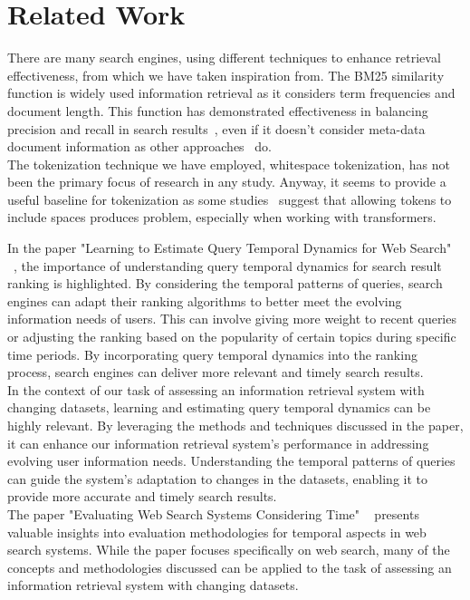 \section{Related Work}
\label{sec:related}


There are many search engines, using different techniques to enhance retrieval effectiveness, from which we have taken
inspiration from.
The BM25 similarity function is widely used information retrieval as it considers term frequencies and document length.
This function has demonstrated effectiveness in balancing precision and recall in search results~\cite{BM25}, even if it
doesn't consider meta-data document information as other approaches~\cite{robertson2009probabilistic} do.\\

The tokenization technique we have employed, whitespace tokenization, has not been the primary focus of research in any
study.
Anyway, it seems to provide a useful baseline for tokenization as some studies~\cite{gowsmith2022improving} suggest that
allowing tokens to include spaces produces problem, especially when working with transformers.


In the paper "Learning to Estimate Query Temporal Dynamics for Web Search" ~\cite{cai2014learning}, 
the importance of understanding query temporal 
dynamics for search result ranking is highlighted. By considering the temporal patterns of 
queries, search engines can adapt their ranking algorithms to better meet the evolving information 
needs of users. This can involve giving more weight to recent queries or adjusting the ranking 
based on the popularity of certain topics during specific time periods. By incorporating query 
temporal dynamics into the ranking process, search engines can deliver more relevant and timely 
search results.\\

In the context of our task of assessing an information retrieval system with changing datasets, 
learning and estimating query temporal dynamics can be highly relevant. By leveraging the methods 
and techniques discussed in the paper, it can enhance our information retrieval system's performance 
in addressing evolving user information needs. Understanding the temporal patterns of queries can 
guide the system's adaptation to changes in the datasets, enabling it to provide more accurate and 
timely search results. \\


The paper "Evaluating Web Search Systems Considering Time" ~\cite{hofmann2014evaluating} presents valuable insights into evaluation methodologies for temporal aspects 
in web search systems. While the paper focuses specifically on web search, many of the concepts and 
methodologies discussed can be applied to the task of assessing an information retrieval system with 
changing datasets. \\

